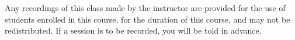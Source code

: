 Any recordings of this class made by the instructor are provided for the use of
students enrolled in this course, for the duration of this course, and may not
be redistributed. If a session is to be recorded, you will be told in advance.
